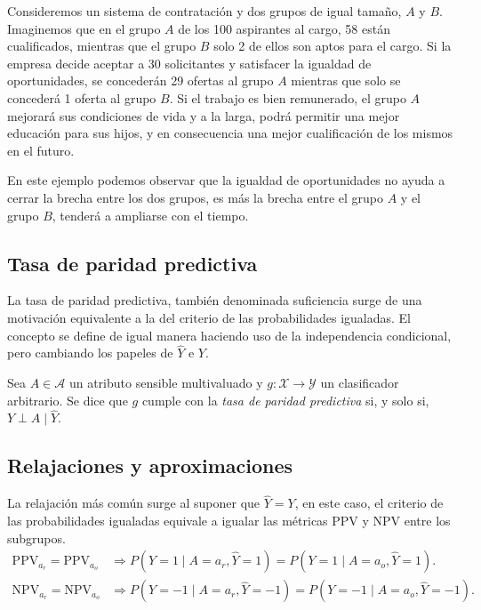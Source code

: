 \documentclass[oneside,openright,titlepage,numbers=noenddot,openany,headinclude,footinclude=true,
cleardoublepage=empty,abstractoff,BCOR=5mm,paper=a4,fontsize=12pt,main=spanish]{scrreprt}
\begin{document}
\begin{example}
Consideremos un sistema de contratación y dos grupos de igual tamaño, $A$ y $B$. Imaginemos que en el grupo $A$ de los 100 aspirantes al cargo, 58 están cualificados, mientras que el grupo $B$ solo 2 de ellos son aptos para el cargo. Si la empresa decide aceptar a 30 solicitantes y satisfacer la igualdad de oportunidades, se concederán 29 ofertas al grupo $A$ mientras que solo se concederá 1 oferta al grupo $B$. Si el trabajo es bien remunerado, el grupo $A$ mejorará sus condiciones de vida y a la larga, podrá permitir una mejor educación para sus hijos, y en consecuencia una mejor cualificación de los mismos en el futuro. 

En este ejemplo podemos observar que la igualdad de oportunidades no ayuda a cerrar la brecha entre los dos grupos, es más la brecha entre el grupo $A$ y el grupo $B$, tenderá a ampliarse con el tiempo. 
\end{example}

\subsection{Tasa de paridad predictiva}

\label{subsec:suficiencia}

La tasa de paridad predictiva, también denominada suficiencia surge de una motivación equivalente a la del criterio de las probabilidades igualadas. El concepto se define de igual manera haciendo uso de la independencia condicional, pero cambiando los papeles de $\hat{Y}$ e $Y$. \\

\begin{definition}
Sea $A \in \mathcal{A}$ un atributo sensible multivaluado y $g\colon \mathcal{X} \to \mathcal{Y}$ un clasificador arbitrario. Se dice que $g$ cumple con la \textit{tasa de paridad predictiva} si, y solo si, $Y \perp A \mid \hat{Y}$.
\end{definition}

\subsection*{Relajaciones y aproximaciones}

La relajación más común surge al suponer que $\hat{Y}=Y$, en este caso, el criterio de las probabilidades igualadas equivale a igualar las métricas PPV y NPV entre los subgrupos. 
\begin{equation*}
\begin{split}
\text{PPV}_{a_r}=\text{PPV}_{a_o} &\Rightarrow P(Y=1 \mid A=a_r, \hat{Y}=1)=P(Y=1 \mid A=a_o, \hat{Y}=1).\\
\text{NPV}_{a_r}=\text{NPV}_{a_o} &\Rightarrow P(Y=-1 \mid A=a_r,\hat{Y}=-1)=P(Y=-1 \mid A=a_o,\hat{Y}=-1).
\end{split}
\end{equation*}
\end{document}

